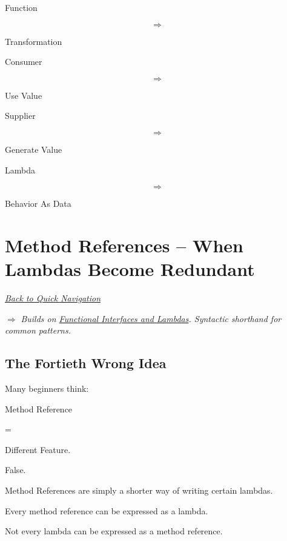 \documentclass[11pt,a4paper]{book}
\begin{document}
Function

\[
\Rightarrow
\]

Transformation


Consumer

\[
\Rightarrow
\]

Use Value


Supplier

\[
\Rightarrow
\]

Generate Value


Lambda

\[
\Rightarrow
\]

Behavior As Data
\chapter{Method References -- When Lambdas Become Redundant}

\smallskip
\noindent
\hyperref[sec:quick_nav]{\emph{Back to Quick Navigation}}

\smallskip
\noindent
\textcolor{RosettaRoyalPurple}{$\Rightarrow$}
\emph{Builds on \hyperref[chap:functional_interfaces]{Functional Interfaces and Lambdas}. Syntactic shorthand for common patterns.}


\section{The Fortieth Wrong Idea}

\begin{trap}

Many beginners think:


Method Reference

=

Different Feature.


False.


Method References are simply
a shorter way of writing
certain lambdas.


Every method reference can be
expressed as a lambda.


Not every lambda can be expressed
as a method reference.

\end{trap}
\end{document}
